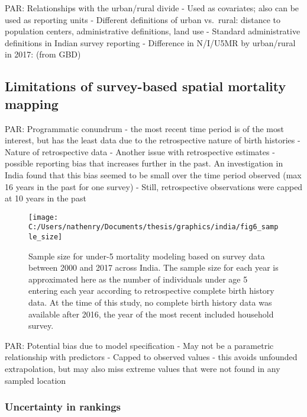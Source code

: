\documentclass[
]{article}
\begin{document}
PAR: Relationships with the urban/rural divide
- Used as covariates; also can be used as reporting units
- Different definitions of urban vs.~rural: distance to population centers, administrative definitions, land use
- Standard administrative definitions in Indian survey reporting
- Difference in N/I/U5MR by urban/rural in 2017: (from GBD)

\hypertarget{limitations-of-survey-based-spatial-mortality-mapping}{%
\subsection{Limitations of survey-based spatial mortality mapping}\label{limitations-of-survey-based-spatial-mortality-mapping}}

PAR: Programmatic conundrum - the most recent time period is of the most interest, but
has the least data due to the retrospective nature of birth histories
- Nature of retrospective data
- Another issue with retrospective estimates - possible reporting bias that increases
further in the past. An investigation in India found that this bias seemed to be small
over the time period observed (max 16 years in the past for one survey)
- Still, retrospective observations were capped at 10 years in the past

\begin{figure}[!hbt]

{\centering \texttt{[image: C:/Users/nathenry/Documents/thesis/graphics/india/fig6\_sample\_size]} 

}

\caption{Sample size for under-5 mortality modeling based on survey data between 2000 and 2017 across India. The sample size for each year is approximated here as the number of individuals under age 5 entering each year according to retrospective complete birth history data. At the time of this study, no complete birth history data was available after 2016, the year of the most recent included household survey.}\label{fig:sample-size}
\end{figure}

PAR: Potential bias due to model specification
- May not be a parametric relationship with predictors
- Capped to observed values - this avoids unfounded extrapolation, but may also miss
extreme values that were not found in any sampled location

\hypertarget{uncertainty-in-rankings}{%
\subsubsection{Uncertainty in rankings}\label{uncertainty-in-rankings}}
\end{document}
